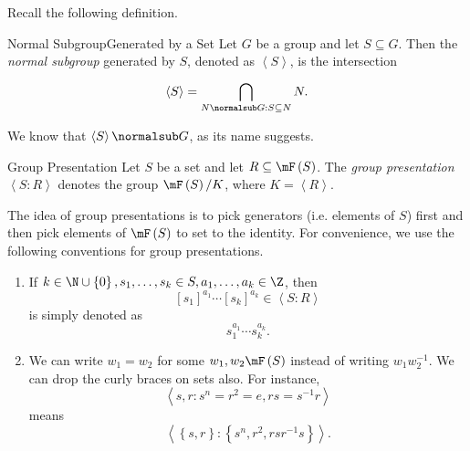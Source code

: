 \documentclass[pmath347]{subfiles}
\begin{document}
    Recall the following definition.

    \begin{recall}{Normal Subgroup}{Generated by a Set}
        Let $G$ be a group and let $S\subseteq G$. Then the \emph{normal subgroup} generated by $S$, denoted as $\left< S \right>$, is the intersection
        \begin{equation*}
            \left< S \right> = \bigcap^{}_{N\normalsub G: S\subseteq N}N.  
        \end{equation*}
    \end{recall}

    \noindent We know that $\left< S \right> \normalsub G$, as its name suggests.  

    \begin{definition}{Group Presentation}{}
        Let $S$ be a set and let $R\subseteq\mF\left( S \right)$. The \emph{group presentation} $\left< S:R \right>$ denotes the group $\mF\left( S \right) /K$, where $K = \left< R \right>$.  
    \end{definition}

    \noindent The idea of group presentations is to pick generators (i.e. elements of $S$) first and then pick elements of $\mF\left( S \right)$ to set to the identity. For convenience, we use the following conventions for group presentations.
    \begin{enumerate}
        \item If $k\in\N\cup\left\lbrace 0 \right\rbrace , s_1,\ldots,s_k\in S, a_1,\ldots,a_k\in\Z$, then
            \begin{equation*}
                \left[ s_1 \right] ^{a_1}\cdots\left[ s_k \right] ^{a_k}\in\left< S:R \right>  
            \end{equation*}
            is simply denoted as
            \begin{equation*}
                s_1^{a_1}\cdots s_k^{a_k}.
            \end{equation*}
        \item We can write $w_1=w_2$ for some $w_1,w_2\mF\left( S \right)$ instead of writing $w_1w_2^{-1}$. We can drop the curly braces on sets also. For instance,
            \begin{equation*}
                \left< s,r: s^n=r^{2} =e, rs=s^{-1} r \right>  
            \end{equation*}
            means
            \begin{equation*}
                \left< \left\lbrace s,r \right\rbrace : \left\lbrace s^n,r^{2} ,rsr^{-1} s \right\rbrace  \right>  .
            \end{equation*}
    \end{enumerate}
\end{document}
